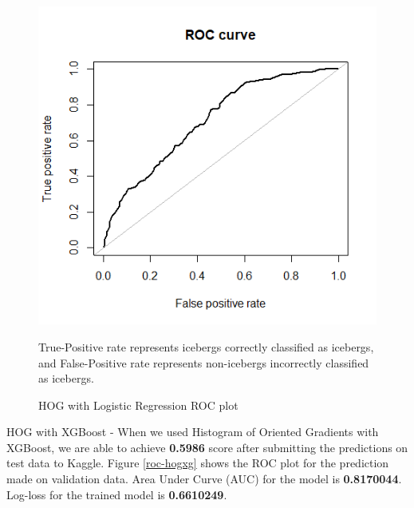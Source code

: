 \documentclass[fleqn,10pt]{SelfArx} %
\begin{document}
\begin{figure}
	\centering
	\includegraphics[width=0.9\linewidth]{iceberg/hog_logit_roc.png}
	\caption{HOG with Logistic Regression ROC plot}\label{roc-hoglgr}
	\small
	True-Positive rate represents icebergs correctly classified as icebergs, and False-Positive rate represents non-icebergs incorrectly classified as icebergs.
\end{figure}

HOG with XGBoost - When we used Histogram of Oriented Gradients with XGBoost, we are able to achieve \textbf{0.5986} score after submitting the predictions on test data to Kaggle. Figure \ref{roc-hogxg} shows the ROC plot for the prediction made on validation data. Area Under Curve (AUC) for the model is \textbf{0.8170044}. Log-loss for the trained model is \textbf{0.6610249}.\\
\end{document}

